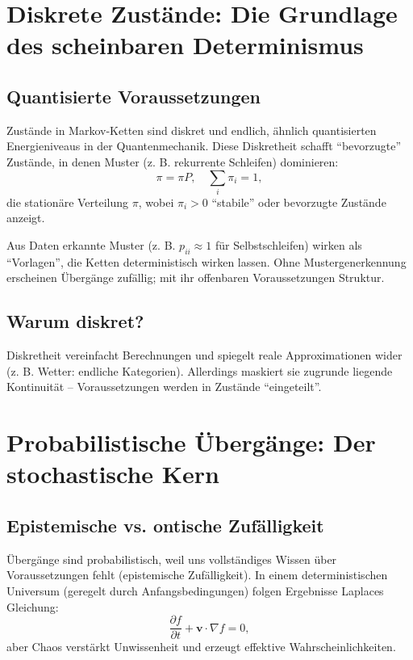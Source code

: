 	\section{Diskrete Zustände: Die Grundlage des scheinbaren Determinismus}
	\label{sec:discrete}
	
	\subsection{Quantisierte Voraussetzungen}
	Zustände in Markov-Ketten sind diskret und endlich, ähnlich quantisierten Energieniveaus in der Quantenmechanik. Diese Diskretheit schafft ``bevorzugte'' Zustände, in denen Muster (z. B. rekurrente Schleifen) dominieren:
	\begin{equation}
		\pi = \pi P, \quad \sum_i \pi_i = 1,
	\end{equation}
	die stationäre Verteilung $\pi$, wobei $\pi_i > 0$ ``stabile'' oder bevorzugte Zustände anzeigt.
	
	Aus Daten erkannte Muster (z. B. $p_{ii} \approx 1$ für Selbstschleifen) wirken als ``Vorlagen'', die Ketten deterministisch wirken lassen. Ohne Mustergenerkennung erscheinen Übergänge zufällig; mit ihr offenbaren Voraussetzungen Struktur.
	
	\subsection{Warum diskret?}
	Diskretheit vereinfacht Berechnungen und spiegelt reale Approximationen wider (z. B. Wetter: endliche Kategorien). Allerdings maskiert sie zugrunde liegende Kontinuität – Voraussetzungen werden in Zustände ``eingeteilt''.
	
	\section{Probabilistische Übergänge: Der stochastische Kern}
	\label{sec:probabilistic}
	
	\subsection{Epistemische vs. ontische Zufälligkeit}
	Übergänge sind probabilistisch, weil uns vollständiges Wissen über Voraussetzungen fehlt (epistemische Zufälligkeit). In einem deterministischen Universum (geregelt durch Anfangsbedingungen) folgen Ergebnisse Laplaces Gleichung:
	\begin{equation}
		\frac{\partial f}{\partial t} + \mathbf{v} \cdot \nabla f = 0,
	\end{equation}
	aber Chaos verstärkt Unwissenheit und erzeugt effektive Wahrscheinlichkeiten.
	

